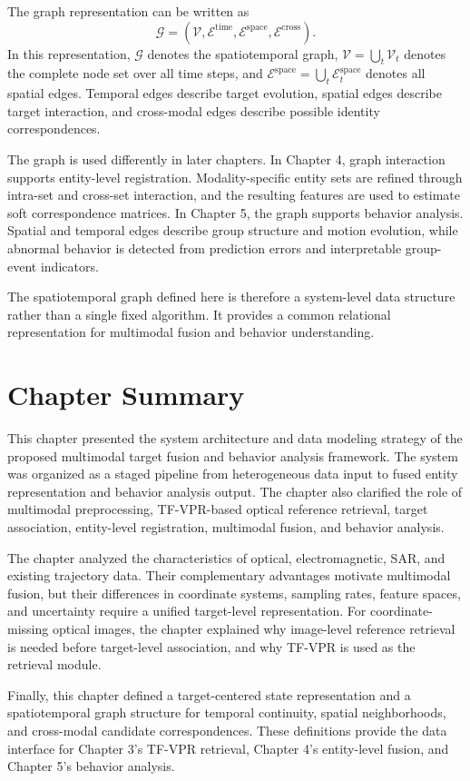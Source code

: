 The graph representation can be written as
\begin{equation}
  \mathcal{G}
  =
  (\mathcal{V},\mathcal{E}^{\mathrm{time}},\mathcal{E}^{\mathrm{space}},\mathcal{E}^{\mathrm{cross}}).
\end{equation}
In this representation, \(\mathcal{G}\) denotes the spatiotemporal graph, \(\mathcal{V}=\bigcup_t\mathcal{V}_t\) denotes the complete node set over all time steps, and \(\mathcal{E}^{\mathrm{space}}=\bigcup_t\mathcal{E}^{\mathrm{space}}_t\) denotes all spatial edges. Temporal edges describe target evolution, spatial edges describe target interaction, and cross-modal edges describe possible identity correspondences.

The graph is used differently in later chapters. In Chapter 4, graph interaction supports entity-level registration. Modality-specific entity sets are refined through intra-set and cross-set interaction, and the resulting features are used to estimate soft correspondence matrices. In Chapter 5, the graph supports behavior analysis. Spatial and temporal edges describe group structure and motion evolution, while abnormal behavior is detected from prediction errors and interpretable group-event indicators.

The spatiotemporal graph defined here is therefore a system-level data structure rather than a single fixed algorithm. It provides a common relational representation for multimodal fusion and behavior understanding.

\section{Chapter Summary}
This chapter presented the system architecture and data modeling strategy of the proposed multimodal target fusion and behavior analysis framework. The system was organized as a staged pipeline from heterogeneous data input to fused entity representation and behavior analysis output. The chapter also clarified the role of multimodal preprocessing, TF-VPR-based optical reference retrieval, target association, entity-level registration, multimodal fusion, and behavior analysis.

The chapter analyzed the characteristics of optical, electromagnetic, SAR, and existing trajectory data. Their complementary advantages motivate multimodal fusion, but their differences in coordinate systems, sampling rates, feature spaces, and uncertainty require a unified target-level representation. For coordinate-missing optical images, the chapter explained why image-level reference retrieval is needed before target-level association, and why TF-VPR is used as the retrieval module.

Finally, this chapter defined a target-centered state representation and a spatiotemporal graph structure for temporal continuity, spatial neighborhoods, and cross-modal candidate correspondences. These definitions provide the data interface for Chapter 3's TF-VPR retrieval, Chapter 4's entity-level fusion, and Chapter 5's behavior analysis.

